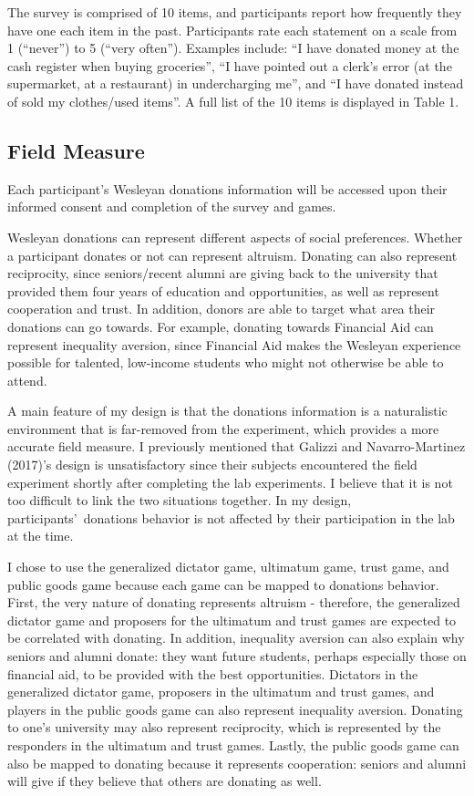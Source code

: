 \documentclass{article}
\begin{document}
The survey is comprised of 10 items, and participants report how frequently they have one each item in the past. Participants rate each statement on a scale from 1 (``never'') to 5 (``very often''). Examples include: ``I have donated money at the cash register when buying groceries'', ``I have pointed out a clerk\rq s error (at the supermarket, at a restaurant) in undercharging me'', and ``I have donated instead of sold my clothes/used items''. A full list of the 10 items is displayed in Table 1. 

\subsection{Field Measure}

Each participant\rq s Wesleyan donations information will be accessed upon their informed consent and completion of the survey and games. 

Wesleyan donations can represent different aspects of social preferences. Whether a participant donates or not can represent altruism. Donating can also represent reciprocity, since seniors/recent alumni are giving back to the university that provided them four years of education and opportunities, as well as represent cooperation and trust. In addition, donors are able to target what area their donations can go towards. For example, donating towards Financial Aid can represent inequality aversion, since Financial Aid makes the Wesleyan experience possible for talented, low-income students who might not otherwise be able to attend.  

A main feature of my design is that the donations information is a naturalistic environment that is far-removed from the experiment, which provides a more accurate field measure. I previously mentioned that Galizzi and Navarro-Martinez (2017)\rq s design is unsatisfactory since their subjects encountered the field experiment shortly after completing the lab experiments. I believe that it is not too difficult to link the two situations together. In my design, participants\rq \ donations behavior is not affected by their participation in the lab at the time. 

I chose to use the generalized dictator game, ultimatum game, trust game, and public goods game because each game can be mapped to donations behavior. First, the very nature of donating represents altruism - therefore, the generalized dictator game and proposers for the ultimatum and trust games are expected to be correlated with donating. In addition, inequality aversion can also explain why seniors and alumni donate: they want future students, perhaps especially those on financial aid, to be provided with the best opportunities. Dictators in the generalized dictator game, proposers in the ultimatum and trust games, and players in the public goods game can also represent inequality aversion.  Donating to one's university may also represent reciprocity, which is represented by the responders in the ultimatum and trust games. Lastly, the public goods game can also be mapped to donating because it represents cooperation: seniors and alumni will give if they believe that others are donating as well. 
	
\end{document}
